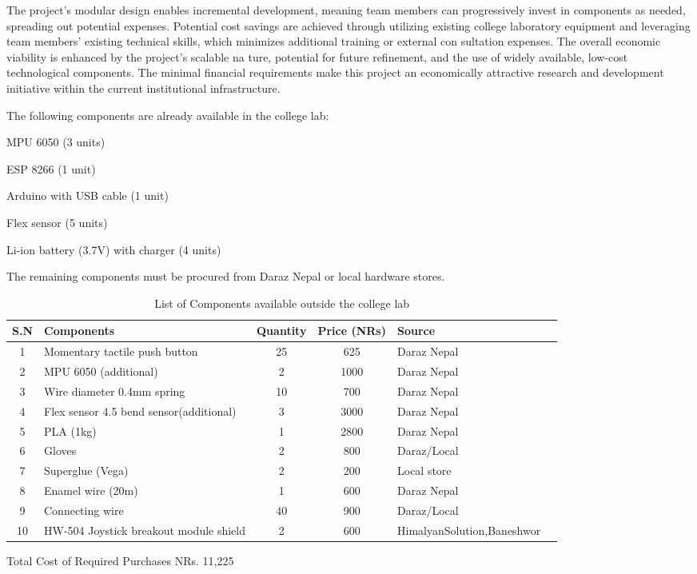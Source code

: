  The project’s modular design enables incremental development, meaning team members can
 progressively invest in components as needed, spreading out potential expenses. Potential cost savings are achieved through utilizing existing college laboratory equipment and leveraging
 team members’ existing technical skills, which minimizes additional training or external con
sultation expenses. The overall economic viability is enhanced by the project’s scalable na
ture, potential for future refinement, and the use of widely available, low-cost technological
 components. The minimal financial requirements make this project an economically attractive
 research and development initiative within the current institutional infrastructure.

 The following components are already available in the college lab:

MPU 6050 (3 units)

ESP 8266 (1 unit)

Arduino with USB cable (1 unit)

Flex sensor (5 units)

Li-ion battery (3.7V) with charger (4 units)

The remaining components must be procured from Daraz Nepal or local hardware stores.

\begin{table}[h]
\centering
\begin{tabular}{c l c c l p{3cm}}
\toprule
\textbf{S.N} & \textbf{Components} & \textbf{Quantity} & \textbf{Price (NRs)} & \textbf{Source} &  \\
\midrule
1 & Momentary tactile push button & 25 & 625 & Daraz Nepal & \\
2 & MPU 6050 (additional) & 2 & 1000 & Daraz Nepal &  \\
3 & Wire diameter 0.4mm spring & 10 & 700 & Daraz Nepal & \\
4 & Flex sensor 4.5 bend sensor(additional) & 3 & 3000 & Daraz Nepal &  \\
5 & PLA (1kg) & 1 & 2800 & Daraz Nepal & \\
6 & Gloves & 2 & 800 & Daraz/Local & \\
7 & Superglue (Vega) & 2 & 200 & Local store & \\
8 & Enamel wire (20m) & 1 & 600 & Daraz Nepal & \\
9 & Connecting wire & 40 & 900 & Daraz/Local & \\
10 & HW-504 Joystick  breakout module shield & 2 & 600 & HimalyanSolution,Baneshwor & \\
\bottomrule
\end{tabular}
\caption{List of Components  available outside the college lab}
\end{table}
Total Cost of Required Purchases
NRs. 11,225
